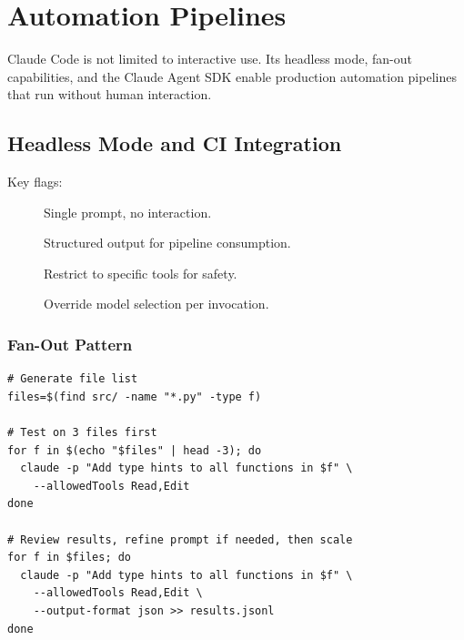 \chapter{Automation Pipelines}
\label{ch:automation}

Claude Code is not limited to interactive use.
Its headless mode, fan-out capabilities, and the Claude Agent SDK
enable production automation pipelines that run without human interaction.

\section{Headless Mode and CI Integration}
\label{sec:headless}


Key flags:

\begin{description}
  \item[] Single prompt, no interaction.
  \item[] Structured output for pipeline consumption.
  \item[] Restrict to specific tools for safety.
  \item[] Override model selection per invocation.
\end{description}

\subsection{Fan-Out Pattern}


\begin{verbatim}
# Generate file list
files=$(find src/ -name "*.py" -type f)

# Test on 3 files first
for f in $(echo "$files" | head -3); do
  claude -p "Add type hints to all functions in $f" \
    --allowedTools Read,Edit
done

# Review results, refine prompt if needed, then scale
for f in $files; do
  claude -p "Add type hints to all functions in $f" \
    --allowedTools Read,Edit \
    --output-format json >> results.jsonl
done
\end{verbatim}

